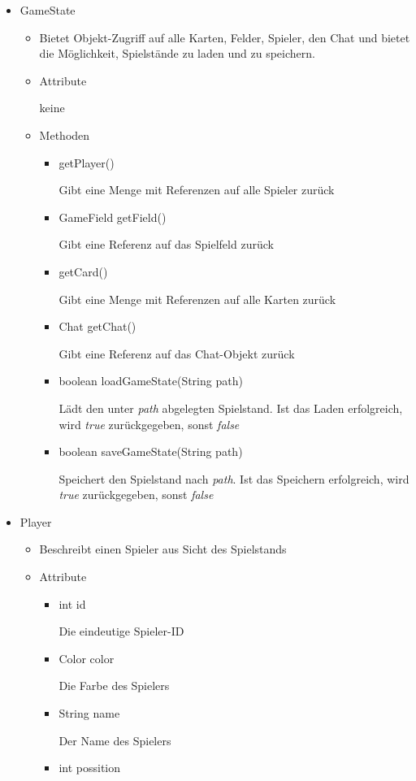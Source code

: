 \documentclass[a4paper,10pt]{article}
\begin{document}
\begin{itemize}

\item GameState
\begin{itemize}
\item Bietet Objekt-Zugriff auf alle Karten, Felder, Spieler, den Chat und bietet die Möglichkeit, Spielstände zu laden und zu speichern.
\item Attribute

keine
\item Methoden
\begin{itemize}
\item getPlayer()

Gibt eine Menge mit Referenzen auf alle Spieler zurück
\item GameField getField()

Gibt eine Referenz auf das Spielfeld zurück
\item getCard()

Gibt eine Menge mit Referenzen auf alle Karten zurück
\item Chat getChat()

Gibt eine Referenz auf das Chat-Objekt zurück
\item boolean loadGameState(String path)

Lädt den unter \textit{path} abgelegten Spielstand. Ist das Laden erfolgreich, wird \textit{true} zurückgegeben, sonst \textit{false}
\item boolean saveGameState(String path)

Speichert den Spielstand nach \textit{path}. Ist das Speichern erfolgreich, wird \textit{true} zurückgegeben, sonst \textit{false}
\end{itemize}
\end{itemize}

\item Player
\begin{itemize}
\item Beschreibt einen Spieler aus Sicht des Spielstands
\item Attribute
\begin{itemize}
\item int id

Die eindeutige Spieler-ID
\item Color color

Die Farbe des Spielers
\item String name

Der Name des Spielers
\item int possition


\end{itemize}
\end{itemize}
\end{itemize}
\end{document}
